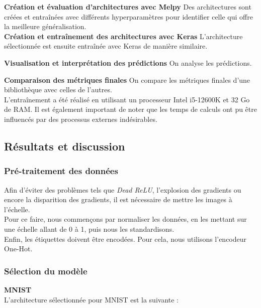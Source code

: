 \begin{multicols}{2}
\textbf{Création et évaluation d’architectures avec Melpy} Des architectures sont créées 
et entraînées avec différents hyperparamètres pour identifier celle qui offre 
la meilleure généralisation.\\

\textbf{Création et entraînement des architectures avec Keras} L'architecture
sélectionnée est ensuite entraînée avec Keras de manière similaire.

\textbf{Visualisation et interprétation des prédictions} On analyse les prédictions. 

\textbf{Comparaison des métriques finales} On compare les métriques finales d'une bibliothèque
avec celles de l'autres. \\

L’entraînement a été réalisé en utilisant un processeur Intel i5-12600K et 32 Go de RAM. Il
est également important de noter que les temps de calculs ont pu être influencés par des processus 
externes indésirables.


\subsection{Résultats et discussion}

\subsubsection{Pré-traitement des données}

Afin d’éviter des problèmes tels que \textit{Dead ReLU}, l’explosion des gradients 
ou encore la disparition des gradients, il est nécessaire de mettre les images à l’échelle.\\

Pour ce faire, nous commençons par normaliser les données, en les mettant sur une 
échelle allant de 0 à 1, puis nous les standardisons.\\

Enfin, les étiquettes doivent être encodées. Pour cela, nous utilisons l’encodeur One-Hot.\\

\subsubsection{Sélection du modèle}

\textbf{MNIST} \\

L'architecture sélectionnée pour MNIST est la suivante : \\


\end{multicols}

